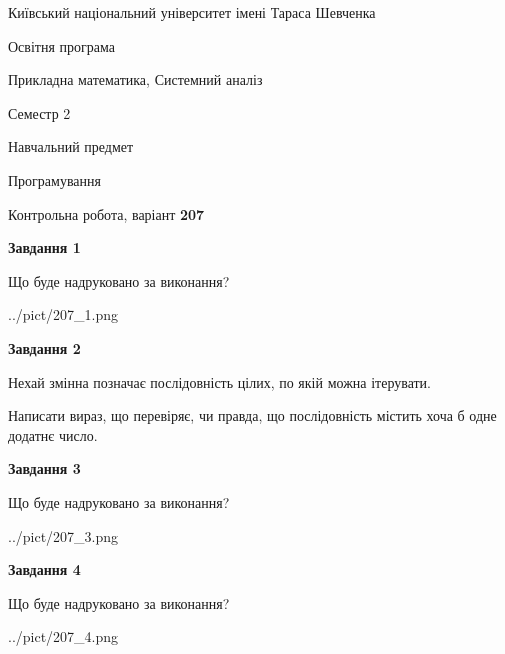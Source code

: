 \documentclass[12pt, ukrainian]{article}
\begin{document}
{{\begin {small}\par
{ \center  Київський національний університет імені Тараса Шевченка \par}
{\parbox {5 cm}{Освітня програма \hfill}{\parbox {8 cm}{Прикладна математика, Системний аналіз \hfill}}\parbox {5 cm}{\hfill Семестр 2}}\par
{\parbox {5 cm} {Навчальний предмет \hfill}\parbox {7 cm}{Програмування \hfill}\parbox {6cm}{\hfill}\par}\vspace{-7pt} \end{small}}{\center Контрольна робота, варіант  \No \textbf
{ 207 }\par}}
{
\begin {large}
{\begin {center}\textbf{Завдання 1}\end {center}}\par
Що буде надруковано за виконання?\par\par
\begin{center}
	{../pict/207_1.png}
\end{center}
\newpage

{\begin {center}\textbf{Завдання 2}\end {center}}\par
Нехай змінна  позначає послідовність цілих, по якій можна ітерувати.

Написати вираз, що перевіряє, чи правда, що послідовність  містить хоча б одне додатнє число.\par
\newpage

{\begin {center}\textbf{Завдання 3}\end {center}}\par
Що буде надруковано за виконання?
\begin{center}
	{../pict/207_3.png}
\end{center}
\newpage

{\begin {center}\textbf{Завдання 4}\end {center}}\par
Що буде надруковано за виконання?\par
\begin{center}
	{../pict/207_4.png}
\end{center}
\newpage


\end{large}}
\end{document}
